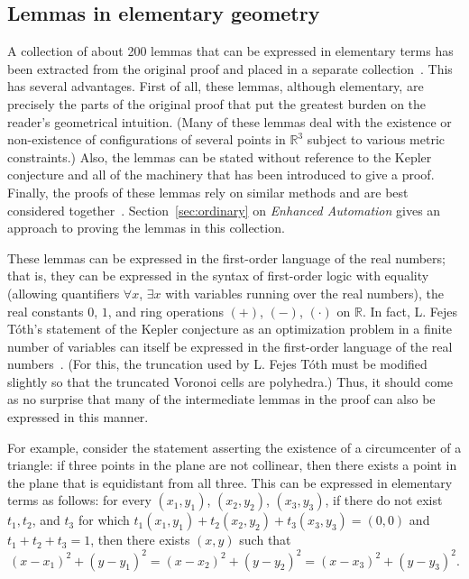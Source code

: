 \documentclass[11pt]{amsart}
\newcommand{\ring}[1]{\mathbb{#1}}
\begin{document}
\subsection{Lemmas in elementary geometry}


A collection of about 200 lemmas that can be expressed in elementary terms has been extracted from 
the original proof and placed in a separate collection~\cite{hales:2008:collection}.  This has
several advantages.  First of all, these lemmas, although elementary, are precisely the parts of the
original proof that put the greatest burden on the reader's geometrical intuition.  (Many of these
lemmas deal with the existence or non-existence of configurations of several points in $\ring{R}^3$ subject to
various metric constraints.)  Also, the lemmas can be stated without reference to the Kepler conjecture and all of the
machinery that has been introduced to give a proof.
Finally, the proofs of these lemmas rely on similar methods and are best considered
together~\cite{1271687}.  Section~\ref{sec:ordinary} on {\it Enhanced Automation} gives an approach to proving the lemmas in this collection.


These lemmas  can be
expressed in the first-order language of the real numbers; that is, they can be expressed in
the syntax of first-order logic with equality (allowing quantifiers $\forall x$, $\exists x$ with variables
running over the real numbers), the real constants $0$, $1$, and ring operations $(+)$, $(-)$,
$(\cdot)$ on $\ring{R}$.  In fact, L. Fejes T\'oth's statement of the Kepler conjecture as
an optimization problem in a finite number of variables can itself be expressed in the
first-order language of the real numbers~\cite{Toth:1972:Lagerungen}.  (For this, the truncation used by L. Fejes T\'oth must be modified slightly so that the truncated Voronoi cells are polyhedra.)  Thus, it should come as no surprise that many
of the intermediate lemmas in the proof can also be expressed in this manner.

For example, consider the statement asserting the existence of a circumcenter of a triangle: 
if three points in the plane are not collinear, then there exists a
point in the plane that is equidistant from all three.  This can be expressed in elementary terms
as follows:  for every $(x_1,y_1)$, $(x_2,y_2)$, $(x_3,y_3)$, if there do not exist $t_1, t_2$, and $t_3$
for which $t_1 (x_1,y_1) + t_2 (x_2,y_2)+ t_3 (x_3,y_3) = (0,0)$ and $t_1+t_2+t_3=1$, then there exists
$(x,y)$ such that 
$$
  (x-x_1)^2 + (y-y_1)^2 = (x-x_2)^2 + (y-y_2)^2 = (x-x_3)^2 + (y-y_3)^2. 
$$
\end{document}
